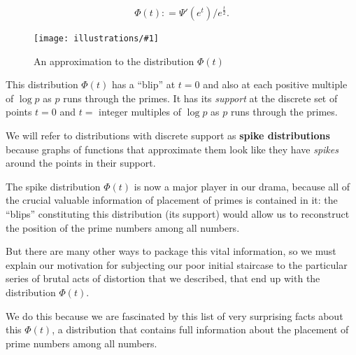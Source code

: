 \documentclass[11pt,draft]{article}
\newcommand{\ill}[3]{ 
   \begin{figure}[H]
   \begin{center}
   \texttt{[image: illustrations/\#1]}
   \caption{#3}
   \end{center}
    \end{figure}
}
\theoremstyle{plain}
\theoremstyle{definition}
\numberwithin{equation}{section}
\numberwithin{figure}{section}
\numberwithin{table}{section}
\begin{document}
$$
  \Phi(t) : = \Psi'(e^t)/e^{\frac{t}{2}}.
$$

  
\bigskip
   
   
\ill{phi_50}{0.6}{An approximation to the distribution $\Phi(t)$}
     
\bigskip


This distribution $\Phi(t)$ has a ``blip'' at $t=0$ and also at each
positive multiple of $\log p$ as $p$ runs through the primes.  It has
its {\em support} at the discrete set of points $t=0$ and $t=$
integer multiples of $\log p$ as $p$ runs through the primes.


We will refer to distributions with discrete support as {\bf spike
  distributions} because graphs of functions that approximate them
look like they have {\em spikes} around the points in their support.

The spike distribution $\Phi(t)$ is now a major player in our drama,
because all of the crucial valuable information of placement of primes
is contained in it: the ``blips'' constituting this distribution (its
support) would allow us to reconstruct the position of the prime
numbers among all numbers.

But there are many other ways to package this vital information, so we
must explain our motivation for subjecting our poor initial staircase
to the particular series of brutal acts of distortion that we
described, that end up with the distribution $\Phi(t)$.

We do this because we are fascinated by this list of very surprising
facts about this $\Phi(t)$, a distribution that contains full
information about the placement of prime numbers among all numbers.
\end{document}
